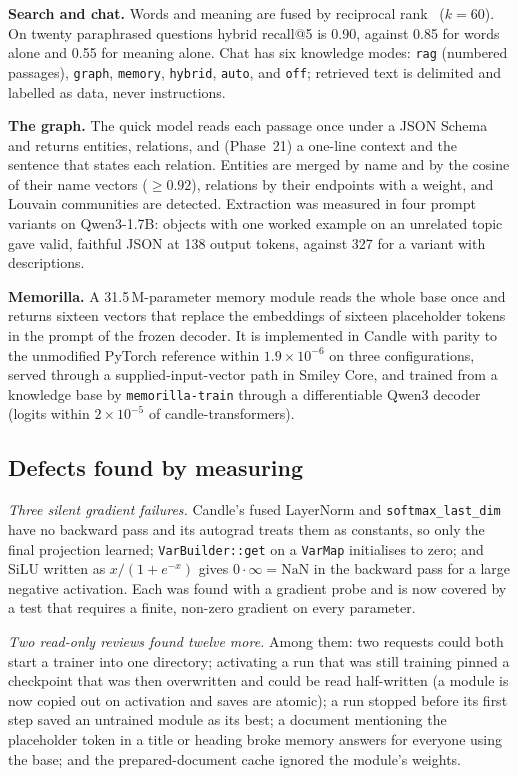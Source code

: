 \textbf{Search and chat.} Words and meaning are fused by reciprocal rank~\cite{cormack2009rrf} ($k{=}60$). On twenty paraphrased questions hybrid recall@5 is
0.90, against 0.85 for words alone and 0.55 for meaning alone. Chat has six knowledge modes: \texttt{rag} (numbered passages), \texttt{graph},
\texttt{memory}, \texttt{hybrid}, \texttt{auto}, and \texttt{off}; retrieved text is delimited and labelled as data, never instructions.

\textbf{The graph.} The quick model reads each passage once under a JSON Schema and returns entities, relations, and (Phase~21) a one-line context and the
sentence that states each relation. Entities are merged by name and by the cosine of their name vectors ($\ge 0.92$), relations by their endpoints with a
weight, and Louvain communities are detected. Extraction was measured in four prompt variants on Qwen3-1.7B: objects with one worked example on an unrelated
topic gave valid, faithful JSON at 138 output tokens, against 327 for a variant with descriptions.

\textbf{Memorilla.} A 31.5\,M-parameter memory module reads the whole base once and returns sixteen vectors that replace the embeddings of sixteen
placeholder tokens in the prompt of the frozen decoder. It is implemented in Candle with parity to the unmodified PyTorch reference within
$1.9{\times}10^{-6}$ on three configurations, served through a supplied-input-vector path in Smiley Core, and trained from a knowledge base by
\texttt{memorilla-train} through a differentiable Qwen3 decoder (logits within $2{\times}10^{-5}$ of candle-transformers).

\subsection{Defects found by measuring}

\emph{Three silent gradient failures.} Candle's fused LayerNorm and \texttt{softmax\_last\_dim} have no backward pass and its autograd treats them as
constants, so only the final projection learned; \texttt{VarBuilder::get} on a \texttt{VarMap} initialises to zero; and SiLU written as
$x/(1+e^{-x})$ gives $0\cdot\infty=\mathrm{NaN}$ in the backward pass for a large negative activation. Each was found with a gradient probe and is now
covered by a test that requires a finite, non-zero gradient on every parameter.

\emph{Two read-only reviews found twelve more.} Among them: two requests could both start a trainer into one directory; activating a run that was still
training pinned a checkpoint that was then overwritten and could be read half-written (a module is now copied out on activation and saves are atomic);
a run stopped before its first step saved an untrained module as its best; a document mentioning the placeholder token in a title or heading broke memory
answers for everyone using the base; and the prepared-document cache ignored the module's weights.

